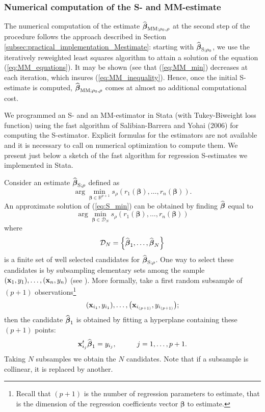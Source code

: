 \subsubsection{Numerical computation of the S- and MM-estimate}

The numerical computation of the estimate $\sthat{\boldsymbol\beta%
}_{\mathrm{MM};\rho_{0},\rho}$ at the second step of the procedure follows the
approach described in Section \ref{subsec:practical_implementation_Mestimate}:
starting with $\widehat{\boldsymbol\beta}_{\mathrm{S};\rho_{0}}$, we use the
iteratively reweighted least squares algorithm to attain a solution of the
equation (\ref{eq:MM_equations}). It may be shown (see
\citet{maronna:etal:2006} that (\ref{eq:MM_min}) decreases at each
iteration, which insures (\ref{eq:MM_inequality}). Hence, once the initial
S-estimate is computed, $\widehat{\boldsymbol\beta}_{\mathrm{MM};\rho
_{0},\rho}$ comes at almost no additional computational cost.

We programmed an S- and an MM-estimator in Stata (with Tukey-Biweight loss
function) using the fast algorithm of Salibian-Barrera and Yohai (2006) for
computing the S-estimator. Explicit formulas for the estimators are not
available and it is necessary to call on numerical optimization to compute
them. We present just below a sketch of the fast algorithm for regression
S-estimates we implemented in Stata.

Consider an estimate $\widehat{\boldsymbol\beta}_{\mathrm{S};\rho}$ defined
as
\begin{equation}
\arg\min_{\boldsymbol\beta\in%
\mathbb{R}
^{p+1}}s_{\rho}\left(  r_{1}\left(  \boldsymbol\beta\right)  ,\ldots
,r_{n}\left(  \boldsymbol\beta\right)  \right)  . \label{eq:S_min}%
\end{equation}
An approximate solution of (\ref{eq:S_min}) can be obtained by finding
$\widehat{\boldsymbol\beta}$ equal to
\[
\arg\min_{\boldsymbol\beta\in\mathcal{D}_{N}}s_{\rho}\left(  r_{1}\left(
\boldsymbol\beta\right)  ,\ldots,r_{n}\left(  \boldsymbol\beta\right)
\right)
\]
where
\[
\mathcal{D}_{N}=\left\{  \sthat{\boldsymbol\beta}_{1},\ldots
,\sthat{\boldsymbol\beta}_{N}\right\}
\]
is a finite set of well selected candidates for $\sthat{\boldsymbol\beta%
}_{\mathrm{S};\rho}$. One way to select these candidates is by subsampling
elementary sets among the sample $\left(  \stvec{x}_{1},y_{1}\right)
,\ldots,\left(  \stvec{x}_{n},y_{n}\right)  $ (see \citealp{rousseeuw:1984}).
More formally, take a first random subsample of $(p+1)$
observations\footnote{Recall that $(p+1)$ is the number of regression
parameters to estimate, that is the dimension of the regression coefficients
vector $\boldsymbol\beta$ to estimate.}
\[
\left(  \stvec{x}_{i_{1}},y_{i_{1}}\right)  ,\ldots,\left(  \stvec{x}%
_{i_{(p+1)}},y_{i_{(p+1)}}\right)  ;
\]
then the candidate $\widehat{\boldsymbol\beta}_{1}$ is obtained by fitting a
hyperplane containing these $(p+1)$ points:
\[
\mathbf x_{i_{j}}^{t}\widehat{\boldsymbol\beta}_{1}=y_{i_{j}},\hspace
{1cm}j=1,\ldots,p+1.
\]
Taking $N$ subsamples we obtain the $N$ candidates. Note that if a subsample
is collinear, it is replaced by another.

